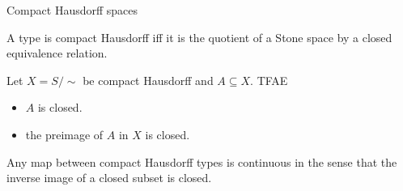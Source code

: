 \documentclass{beamer}
\begin{document}
\begin{frame}{Compact Hausdorff spaces}
  \begin{definition}
    A type is compact Hausdorff iff it is the quotient of a 
    Stone space by a closed equivalence relation. 
  \end{definition}
  \pause
  \begin{lemma}
    Let $X = S / \sim $ be compact Hausdorff and $A\subseteq X$. TFAE
    \begin{itemize}
      \item $A$ is closed. 
      \item the preimage of $A$ in $X$ is closed. 
    \end{itemize}
\end{lemma}
\pause
  \begin{corollary}
    Any map between compact Hausdorff types is 
    continuous in the sense that the 
    inverse image of a closed subset is closed. 
  \end{corollary}
\end{frame} 
\end{document}

